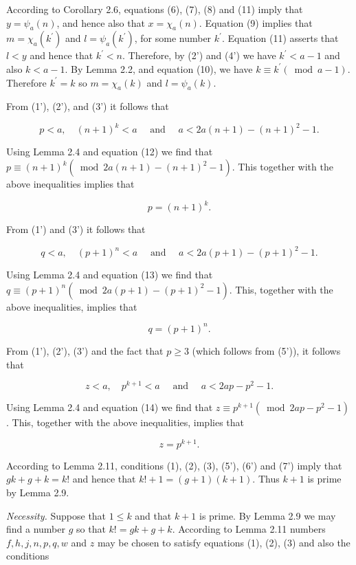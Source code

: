 \documentclass[10pt,letterpaper]{article}
\newcommand{\origpage}[1]{\marginnote{\footnotesize\textbf{[#1]}}}
\begin{document}
According to Corollary 2.6, equations (6), (7), (8) and (11) imply that $y=\psi_{a}(n)$, and hence also that $x=\chi_{a}(n)$. Equation (9) implies that $m=\chi_{a}\left(k^{\prime}\right)$ and $l=\psi_{a}\left(k^{\prime}\right)$, for some number $k^{\prime}$. Equation (11) asserts that $l<y$ and hence that $k^{\prime}<n$. Therefore, by (2') and (4') we have $k^{\prime}<a-1$ and also $k<a-1$. By Lemma 2.2, and equation (10), we have $k \equiv k^{\prime}(\bmod a-1)$. Therefore $k^{\prime}=k$ so $m=\chi_{a}(k)$ and $l=\psi_{a}(k)$.

From (1'), (2'), and (3') it follows that

\[
p<a, \quad(n+1)^{k}<a \quad \text { and } \quad a<2 a(n+1)-(n+1)^{2}-1 .
\]

\origpage{455}Using Lemma 2.4 and equation (12) we find that $p \equiv(n+1)^{k}\left(\bmod 2 a(n+1)-(n+1)^{2}-1\right)$. This together with the above inequalities implies that


\begin{equation*}
p=(n+1)^{k} . \tag{5'}
\end{equation*}


From (1') and (3') it follows that

\[
q<a, \quad(p+1)^{n}<a \quad \text { and } \quad a<2 a(p+1)-(p+1)^{2}-1 .
\]

Using Lemma 2.4 and equation (13) we find that $q \equiv(p+1)^{n}\left(\bmod 2 a(p+1)-(p+1)^{2}-1\right)$. This, together with the above inequalities, implies that


\begin{equation*}
q=(p+1)^{n} . \tag{6'}
\end{equation*}


From (1'), (2'), (3') and the fact that $p\geq3$ (which follows from (5')), it follows that

\[
z<a, \quad p^{k+1}<a \quad \text { and } \quad a<2 a p-p^{2}-1 .
\]

Using Lemma 2.4 and equation (14) we find that $z \equiv p^{k+1}\left(\bmod 2 a p-p^{2}-1\right)$. This, together with the above inequalities, implies that


\begin{equation*}
z=p^{k+1} . \tag{7'}
\end{equation*}


According to Lemma 2.11, conditions (1), (2), (3), (5'), (6') and (7') imply that $g k+g+k=k!$ and hence that $k!+1=(g+1)(k+1)$. Thus $k+1$ is prime by Lemma 2.9.

\textit{Necessity.} Suppose that $1 \leq k$ and that $k+1$ is prime. By Lemma 2.9 we may find a number $g$ so that $k!=g k+g+k$. According to Lemma 2.11 numbers $f, h, j, n, p, q, w$ and $z$ may be chosen to satisfy equations (1), (2), (3) and also the conditions
\end{document}
